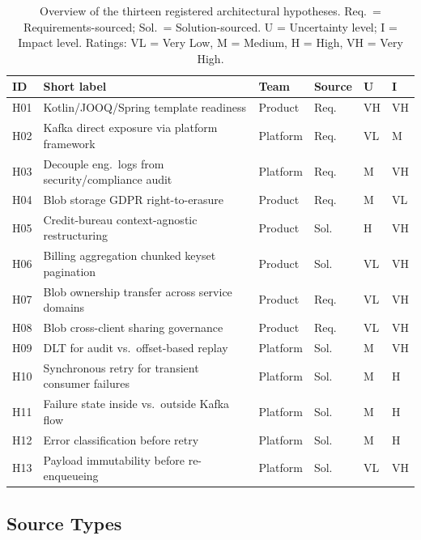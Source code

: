 \begin{table}[htbp]
\caption{Overview of the thirteen registered architectural hypotheses.
  Req.\ = Requirements-sourced; Sol.\ = Solution-sourced.
  U = Uncertainty level; I = Impact level.
  Ratings: VL = Very Low, M = Medium, H = High, VH = Very High.}
\label{tab:hypotheses-overview}
\centering\small
\begin{tabular}{llllll}
\toprule
\textbf{ID} & \textbf{Short label} & \textbf{Team} & \textbf{Source} &
\textbf{U} & \textbf{I} \\
\midrule
H01 & Kotlin/JOOQ/Spring template readiness & Product  & Req. & VH & VH \\
H02 & Kafka direct exposure via platform framework & Platform & Req. & VL & M  \\
H03 & Decouple eng.\ logs from security/compliance audit & Platform & Req. & M  & VH \\
H04 & Blob storage GDPR right-to-erasure & Product  & Req. & M  & VL \\
H05 & Credit-bureau context-agnostic restructuring & Product  & Sol. & H  & VH \\
H06 & Billing aggregation chunked keyset pagination & Product  & Sol. & VL & VH \\
H07 & Blob ownership transfer across service domains & Product  & Req. & VL & VH \\
H08 & Blob cross-client sharing governance & Product  & Req. & VL & VH \\
H09 & DLT for audit vs.\ offset-based replay & Platform & Sol. & M  & VH \\
H10 & Synchronous retry for transient consumer failures & Platform & Sol. & M  & H  \\
H11 & Failure state inside vs.\ outside Kafka flow & Platform & Sol. & M  & H  \\
H12 & Error classification before retry & Platform & Sol. & M  & H  \\
H13 & Payload immutability before re-enqueueing & Platform & Sol. & VL & VH \\
\bottomrule
\end{tabular}
\end{table}

\subsection{Source Types}
\label{subsec:source-types}

